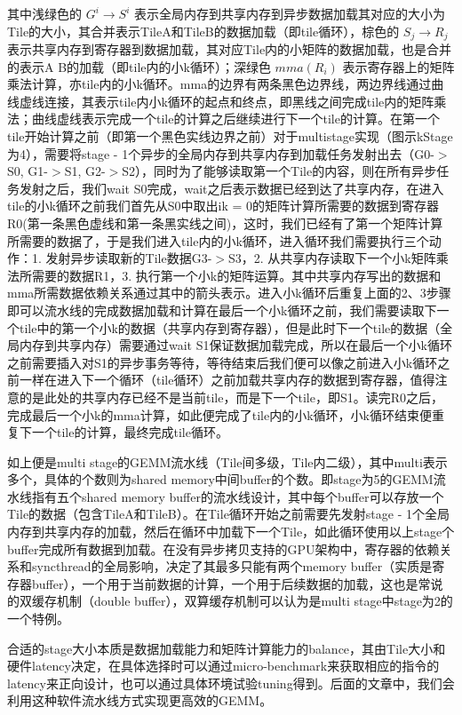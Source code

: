 其中浅绿色的 $G^i\rightarrow S^i$ 表示全局内存到共享内存到异步数据加载其对应的大小为Tile的大小，其合并表示TileA和TileB的数据加载（即tile循环），棕色的 $S_j \rightarrow R_j$ 表示共享内存到寄存器到数据加载，其对应Tile内的小矩阵的数据加载，也是合并的表示A B的加载（即tile内的小k循环）；深绿色 $mma(R_i)$ 表示寄存器上的矩阵乘法计算，亦tile内的小k循环。mma的边界有两条黑色边界线，两边界线通过曲线虚线连接，其表示tile内小k循环的起点和终点，即黑线之间完成tile内的矩阵乘法；曲线虚线表示完成一个tile的计算之后继续进行下一个tile的计算。在第一个tile开始计算之前（即第一个黑色实线边界之前）对于multistage实现（图示kStage为4），需要将stage - 1个异步的全局内存到共享内存到加载任务发射出去（G0-$>$S0, G1-$>$S1, G2-$>$S2），同时为了能够读取第一个Tile的内容，则在所有异步任务发射之后，我们wait S0完成，wait之后表示数据已经到达了共享内存，在进入tile的小k循环之前我们首先从S0中取出ik = 0的矩阵计算所需要的数据到寄存器R0(第一条黑色虚线和第一条黑实线之间)，这时，我们已经有了第一个矩阵计算所需要的数据了，于是我们进入tile内的小k循环，进入循环我们需要执行三个动作：1. 发射异步读取新的Tile数据G3-$>$S3，2. 从共享内存读取下一个小k矩阵乘法所需要的数据R1，3. 执行第一个小k的矩阵运算。其中共享内存写出的数据和mma所需数据依赖关系通过其中的箭头表示。进入小k循环后重复上面的2、3步骤即可以流水线的完成数据加载和计算在最后一个小k循环之前，我们需要读取下一个tile中的第一个小k的数据（共享内存到寄存器），但是此时下一个tile的数据（全局内存到共享内存）需要通过wait S1保证数据加载完成，所以在最后一个小k循环之前需要插入对S1的异步事务等待，等待结束后我们便可以像之前进入小k循环之前一样在进入下一个循环（tile循环）之前加载共享内存的数据到寄存器，值得注意的是此处的共享内存已经不是当前tile，而是下一个tile，即S1。读完R0之后，完成最后一个小k的mma计算，如此便完成了tile内的小k循环，小k循环结束便重复下一个tile的计算，最终完成tile循环。

如上便是multi stage的GEMM流水线（Tile间多级，Tile内二级），其中multi表示多个，具体的个数则为shared memory中间buffer的个数。即stage为5的GEMM流水线指有五个shared memory buffer的流水线设计，其中每个buffer可以存放一个Tile的数据（包含TileA和TileB）。在Tile循环开始之前需要先发射stage - 1个全局内存到共享内存的加载，然后在循环中加载下一个Tile，如此循环使用以上stage个buffer完成所有数据到加载。在没有异步拷贝支持的GPU架构中，寄存器的依赖关系和syncthread的全局影响，决定了其最多只能有两个memory buffer（实质是寄存器buffer），一个用于当前数据的计算，一个用于后续数据的加载，这也是常说的双缓存机制（double buffer），双算缓存机制可以认为是multi stage中stage为2的一个特例。

合适的stage大小本质是数据加载能力和矩阵计算能力的balance，其由Tile大小和硬件latency决定，在具体选择时可以通过micro-benchmark来获取相应的指令的latency来正向设计，也可以通过具体环境试验tuning得到。后面的文章中，我们会利用这种软件流水线方式实现更高效的GEMM。

